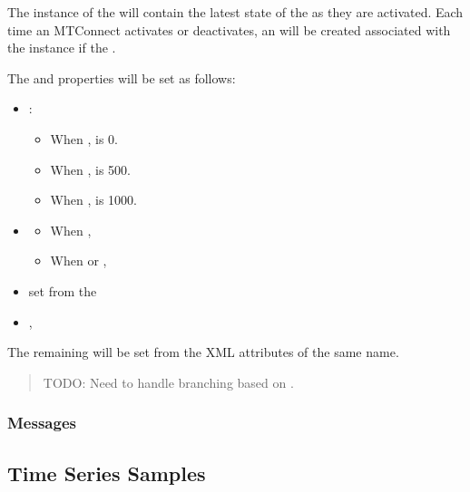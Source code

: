 The instance of the  will contain the latest state of the  as they are activated. Each time an MTConnect  activates or deactivates, an   will be created associated with the instance if the  . 

The  and  properties will be set as follows:

\begin{itemize}
    \item {}:
    \begin{itemize}
        \item When ,  is 0.
        \item When ,  is 500.
        \item When ,  is 1000.
    \end{itemize}
    \item {}
    \begin{itemize}
        \item When , 
        \item When  or , 
    \end{itemize}
    \item {} set from the 
    \item {}, 
\end{itemize}

The remaining  will be set from the XML attributes of the same name.

\begin{quote}
    \color{red} TODO: Need to handle branching based on .
\end{quote}

\subsubsection{Messages}

\subsection{Time Series Samples}
